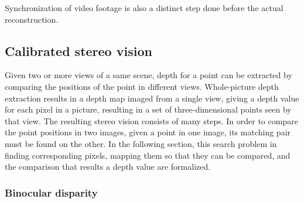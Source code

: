 Synchronization of video footage is also a distinct step done before the actual reconstruction.




\subsection{Calibrated stereo vision} %

Given two or more views of a same scene, depth for a point can be extracted by comparing the positions of the point in different views.
Whole-picture depth extraction results in a depth map imaged from a single view, giving a depth value for each pixel in a picture, resulting in a set of three-dimensional points seen by that view.
The resulting stereo vision consists of many steps.
In order to compare the point positions in two images, given a point in one image, its matching pair must be found on the other.
In the following section, this search problem in finding corresponding pixels, mapping them so that they can be compared, and the comparison that results a depth value are formalized.


\subsubsection{Binocular disparity} \label{sec:binocular} %


